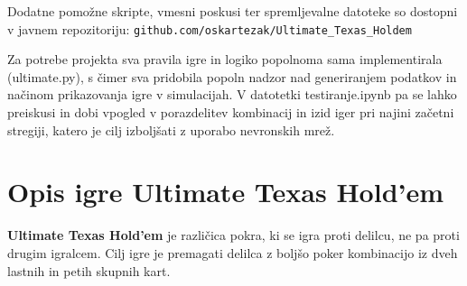 \documentclass[a4paper,12pt]{article}
\begin{document}
Dodatne pomožne skripte, vmesni poskusi ter spremljevalne datoteke so dostopni v javnem repozitoriju:
\texttt{github.com/oskartezak/Ultimate\_Texas\_Holdem}

Za potrebe projekta sva pravila igre in logiko popolnoma sama implementirala (ultimate.py), 
s čimer sva pridobila popoln nadzor nad generiranjem podatkov in načinom 
prikazovanja igre v simulacijah. V datotetki testiranje.ipynb pa se lahko preiskusi in dobi vpogled v porazdelitev
kombinacij in izid iger pri najini začetni stregiji, katero je cilj izboljšati z uporabo nevronskih mrež.

\section{Opis igre Ultimate Texas Hold'em} 



\textbf{Ultimate Texas Hold'em} je različica pokra, ki se igra proti delilcu, 
ne pa proti drugim igralcem. Cilj igre je premagati delilca z boljšo 
poker kombinacijo iz dveh lastnih in petih skupnih kart.
\end{document}
